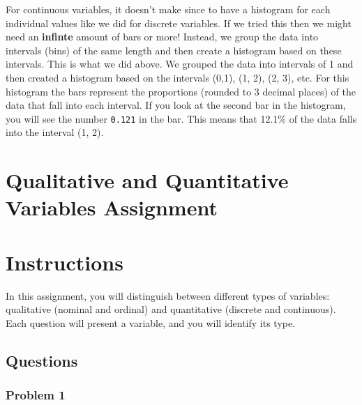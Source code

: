 \documentclass[
  letterpaper,
  DIV=11,
  numbers=noendperiod]{scrreprt}
\begin{document}
For continuous variables, it doesn't make since to have a histogram for
each individual values like we did for discrete variables. If we tried
this then we might need an \textbf{infinte} amount of bars or more!
Instead, we group the data into intervals (bins) of the same length and
then create a histogram based on these intervals. This is what we did
above. We grouped the data into intervals of 1 and then created a
histogram based on the intervals (0,1), (1, 2), (2, 3), etc. For this
histogram the bars represent the proportions (rounded to 3 decimal
places) of the data that fall into each interval. If you look at the
second bar in the histogram, you will see the number \texttt{0.121} in
the bar. This means that 12.1\% of the data falls into the interval (1,
2).


\chapter*{Qualitative and Quantitative Variables
Assignment}\label{qualitative-and-quantitative-variables-assignment}



\chapter*{Instructions}\label{instructions}


In this assignment, you will distinguish between different types of
variables: qualitative (nominal and ordinal) and quantitative (discrete
and continuous). Each question will present a variable, and you will
identify its type.

\section*{Questions}\label{questions}


\subsection*{Problem 1}\label{problem-1}
\end{document}
